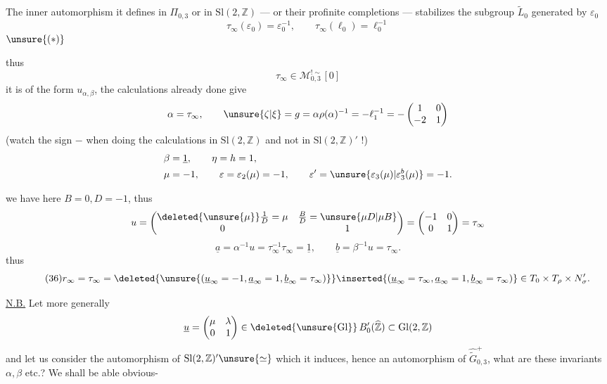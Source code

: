 The inner automorphism it defines in $\Pi_{0,3}$ or in $\mathrm{Sl}(2,\mathbb Z)$ --- or their profinite completions --- stabilizes the subgroup $\widetilde L_0$ generated by $\varepsilon_0$ 
\[
\tau_\infty(\varepsilon_0)=\varepsilon_0^{-1},\qquad\tau_\infty(\ell_0)=\ell_0^{-1}
\]
$\unsure{(\ast)}$

thus
\[
\tau_\infty\in\mathcal M_{0,3}^{!\sim}[0]
\]
  it is of the form $u_{\alpha,\beta}$,  the calculations already done give
\[
\alpha=\tau_\infty,\qquad
\unsure{\zeta|\xi}=g=\alpha\rho(\alpha)^{-1}=-\ell_1^{-1}
=-\begin{pmatrix}1&0\\-2&1\end{pmatrix}
\]
(watch the sign $-$ when doing the calculations in $\mathrm{Sl}(2,\mathbb Z)$ and not in $\mathrm{Sl}(2,\mathbb Z)'$ !)
\[
\begin{aligned}
\beta&=\underline1,\qquad\eta=h=1,\\
\mu&=-1,\qquad\varepsilon=\varepsilon_2(\mu)=-1,\qquad
\varepsilon'=\unsure{\varepsilon_3(\mu)|\varepsilon_3^b(\mu)}=-1.
\end{aligned}
\]

we have here $B=0,D=-1$, thus
\[
u=\begin{pmatrix}
\deleted{\unsure{\mu}}\frac1D=\mu&\frac BD=\unsure{\mu D|\mu B}\\
0&1
\end{pmatrix}
=\begin{pmatrix}-1&0\\0&1\end{pmatrix}=\tau_\infty
\]
\[
\underline a=\alpha^{-1}u=\tau_\infty^{-1}\tau_\infty=\underline1,
\qquad\underline b=\beta^{-1}u=\tau_\infty.
\]
thus
\[
\tag{36}
r_\infty=\tau_\infty=
\deleted{\unsure{(\underline u_\infty=-1,\underline a_\infty=1,\underline b_\infty=\tau_\infty)}}
\inserted{(\underline u_\infty=\tau_\infty,\underline a_\infty=1,\underline b_\infty=\tau_\infty)}
\in T_0\times T_\rho\times N'_\sigma.
\]

\uline{N.B.} Let more generally
\[
\underline u=\begin{pmatrix}\mu&\lambda\\0&1\end{pmatrix}
\in\deleted{\unsure{\mathrm{Gl}}}\,B'_0(\widehat{\mathbb Z})\subset\mathrm{Gl}(2,\mathbb Z)
\]
and let us consider the  automorphism of $\mathrm{Sl}(2,\mathbb Z)'\unsure{\simeq}$ which it induces, hence an automorphism  of $\widehat{\widetilde G}_{0,3}^{+}$, what are these invariants $\alpha,\beta$ etc.? We shall be able obvious-
